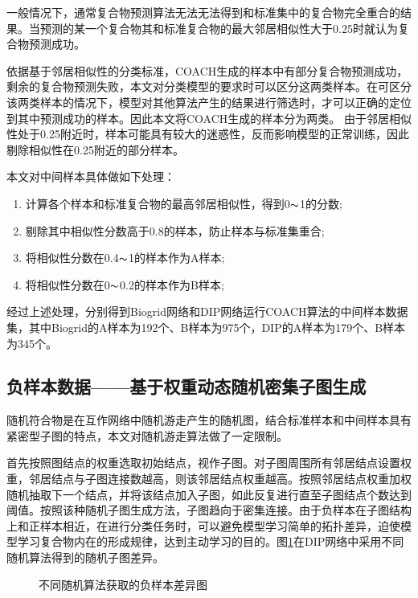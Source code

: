 一般情况下，通常复合物预测算法无法无法得到和标准集中的复合物完全重合的结果。当预测的某一个复合物其和标准复合物的最大邻居相似性大于0.25时就认为复合物预测成功。

依据基于邻居相似性的分类标准，COACH生成的样本中有部分复合物预测成功，剩余的复合物预测失败，本文对分类模型的要求时可以区分这两类样本。在可区分该两类样本的情况下，模型对其他算法产生的结果进行筛选时，才可以正确的定位到其中预测成功的样本。因此本文将COACH生成的样本分为两类。
由于邻居相似性处于0.25附近时，样本可能具有较大的迷惑性，反而影响模型的正常训练，因此剔除相似性在0.25附近的部分样本。

本文对中间样本具体做如下处理：
\begin{enumerate}
    \item 计算各个样本和标准复合物的最高邻居相似性，得到0$\thicksim$1的分数;
    \item 剔除其中相似性分数高于0.8的样本，防止样本与标准集重合;
    \item 将相似性分数在0.4$\thicksim$1的样本作为A样本;
    \item 将相似性分数在0$\thicksim$0.2的样本作为B样本;
\end{enumerate}

经过上述处理，分别得到Biogrid网络和DIP网络运行COACH算法的中间样本数据集，其中Biogrid的A样本为192个、B样本为975个，DIP的A样本为179个、B样本为345个。

\subsection{负样本数据——基于权重动态随机密集子图生成}
\label{subsection:allSample:negtiveSampleData}


随机符合物是在互作网络中随机游走产生的随机图，结合标准样本和中间样本具有紧密型子图的特点，本文对随机游走算法做了一定限制。

首先按照图结点的权重选取初始结点，视作子图。对子图周围所有邻居结点设置权重，邻居结点与子图连接数越高，则该邻居结点权重越高。按照邻居结点权重加权随机抽取下一个结点，并将该结点加入子图，如此反复进行直至子图结点个数达到阈值。按照该种随机子图生成方法，子图趋向于密集连接。由于负样本在子图结构上和正样本相近，在进行分类任务时，可以避免模型学习简单的拓扑差异，迫使模型学习复合物内在的形成规律，达到主动学习的目的。图\ref{fig:diffrent-random-garphs}在DIP网络中采用不同随机算法得到的随机子图差异。

\begin{figure}[htbp]
    \centering
    \vskip0.5cm
    \caption{不同随机算法获取的负样本差异图}
    \label{fig:diffrent-random-garphs}
\end{figure}


